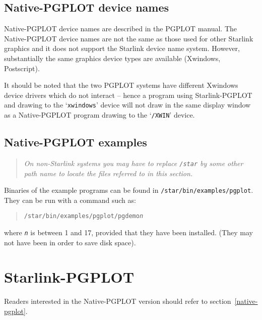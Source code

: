 \documentclass[twoside,11pt]{article}
\newcommand{\htmlref}[2]{#1}
\newcommand{\latexhtml}[2]{#1}
\newcommand{\xlabel}[1]{}
\renewcommand{\_}{\texttt{\symbol{95}}}
\begin{document}
\subsection{\xlabel{native-pgplot_device_names}Native-PGPLOT device names}
\label{native-pgplot_device_names}

Native-PGPLOT device names are described in the PGPLOT manual.  The
Native-PGPLOT device names are not the same as those used for other
Starlink graphics and it does not support the Starlink device name system.
However, substantially the same graphics device types are available
(Xwindows, Postscript).  

It should be noted that the two PGPLOT systems have different Xwindows
device drivers which do not interact -- hence a program using
Starlink-PGPLOT and drawing to the `\texttt{xwindows}' device will not draw 
in the same display window as a Native-PGPLOT program drawing to the 
`\texttt{/XWIN}' device.

\subsection{\xlabel{native_pgplot_examples}Native-PGPLOT examples}
\label{native_pgplot_examples}

\begin{quote}
\emph{ On non-Starlink systems you may have to replace \texttt{/star} by 
some other path name to locate the files referred to in this section.}
\end{quote}

Binaries of the example programs can be found in
\texttt{/star/bin/examples/pgplot}.
They can be run with a command such as:

\begin{quote}
\texttt{/star/bin/examples/pgplot/pgdemo{\emph{n}}}
\end{quote}

where \texttt{\emph{n}} is between 1 and 17, provided that they have 
been installed.  (They may not have been in order to save disk space).

\section{\xlabel{starlink-pgplot}Starlink-PGPLOT}
\label{starlink-pgplot}

Readers interested in the Native-PGPLOT version should refer to 
section~\latexhtml{\ref{native-pgplot}} %
{\htmlref{\emph{Native-PGPLOT}}{native-pgplot}}.
\end{document}
